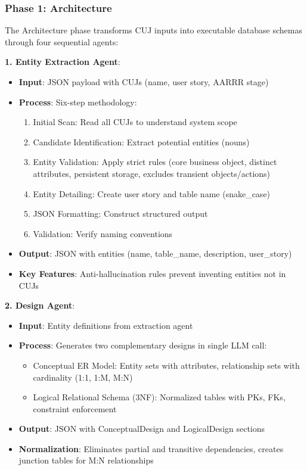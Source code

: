 \documentclass[12pt,a4paper]{article}
\begin{document}
\subsubsection{Phase 1: Architecture}

The Architecture phase transforms CUJ inputs into executable database schemas through four sequential agents:

\textbf{1. Entity Extraction Agent}:
\begin{itemize}
\item \textbf{Input}: JSON payload with CUJs (name, user story, AARRR stage)
\item \textbf{Process}: Six-step methodology:
\begin{enumerate}
\item Initial Scan: Read all CUJs to understand system scope
\item Candidate Identification: Extract potential entities (nouns)
\item Entity Validation: Apply strict rules (core business object, distinct attributes, persistent storage, excludes transient objects/actions)
\item Entity Detailing: Create user story and table name (snake\_case)
\item JSON Formatting: Construct structured output
\item Validation: Verify naming conventions
\end{enumerate}
\item \textbf{Output}: JSON with entities (name, table\_name, description, user\_story)
\item \textbf{Key Features}: Anti-hallucination rules prevent inventing entities not in CUJs
\end{itemize}

\textbf{2. Design Agent}:
\begin{itemize}
\item \textbf{Input}: Entity definitions from extraction agent
\item \textbf{Process}: Generates two complementary designs in single LLM call:
\begin{itemize}
\item Conceptual ER Model: Entity sets with attributes, relationship sets with cardinality (1:1, 1:M, M:N)
\item Logical Relational Schema (3NF): Normalized tables with PKs, FKs, constraint enforcement
\end{itemize}
\item \textbf{Output}: JSON with ConceptualDesign and LogicalDesign sections
\item \textbf{Normalization}: Eliminates partial and transitive dependencies, creates junction tables for M:N relationships
\end{itemize}
\end{document}
